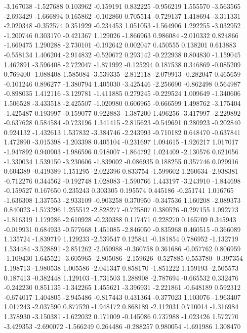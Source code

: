 -3.167038
-1.527688
0.103962
-0.159191
0.832225
-0.956219
1.555570
-3.563565
-2.693429
-1.666894
0.165862
-0.102860
0.705514
-0.729137
1.418694
-3.311331
-2.020348
-0.352574
0.351929
-0.234453
1.051053
-1.564906
1.292255
-3.032952
-1.200746
0.303170
-0.421367
1.129026
-1.866963
0.986084
-2.010332
0.824866
-1.669475
1.290288
-2.730101
-0.192642
0.002047
0.450555
0.138201
0.613883
-0.558134
1.406204
-2.914832
-0.520672
0.293142
-0.222938
0.804830
-1.159045
1.462891
-3.596408
-2.722047
-1.871992
-0.125294
0.187538
0.346869
-0.085209
0.769400
-1.088408
1.585084
-3.539335
-2.812118
-2.079913
-0.282047
0.465659
-0.101246
0.896277
-1.380794
1.405030
-3.425446
-2.256690
-0.862498
0.564987
-0.898035
1.412116
-3.129781
-1.411885
0.279245
-0.229524
1.009649
-1.340606
1.506528
-3.433518
-2.425507
-1.020980
0.606965
-0.666599
1.498762
-3.175404
-1.425487
0.193997
-0.159077
0.922883
-1.387200
1.496256
-3.417997
-2.229892
-0.637628
0.584584
-0.723196
1.341415
-2.815623
-0.549691
0.280923
-0.202840
0.924132
-1.432613
1.537832
-3.384746
-2.243993
-0.710182
0.648470
-0.637841
1.472890
-3.015398
-1.203398
0.405104
-0.231697
1.094615
-1.926217
1.017017
-1.947892
0.940903
-1.986596
0.918007
-1.864792
1.024409
-2.130576
0.621056
-1.330034
1.539150
-3.230606
-1.839002
-0.086935
0.188255
0.357746
0.029916
0.604389
-0.419389
1.151295
-2.022396
0.833754
-1.599602
1.260634
-2.938381
-0.712276
0.344562
-0.192748
1.028083
-1.590766
1.443197
-3.243910
-1.844698
-0.159527
0.167650
0.235243
0.303305
0.195574
0.445186
-0.251741
1.016765
-1.636308
1.337553
-2.933109
-0.903258
0.370950
-0.347536
1.160208
-2.089373
0.840023
-1.573296
1.255512
-2.828277
-0.725807
0.380526
-0.297155
1.092773
-1.816319
1.179286
-2.610928
-0.230388
0.117471
0.228270
0.165709
0.345943
-0.019931
0.684933
-0.577668
1.451085
-2.846050
-0.835968
0.460515
-0.366089
1.135724
-1.839719
1.129233
-2.539547
0.125841
-0.181854
0.786952
-1.132719
1.534484
-3.528891
-2.851262
-2.050988
-0.360758
0.361686
-0.057762
0.806959
-1.109430
1.645521
-3.605965
-2.805086
-2.159626
-0.527885
0.553780
-0.397354
1.198713
-1.980538
1.005586
-2.041347
0.858170
-1.851222
1.159193
-2.505573
0.187413
-0.382448
1.129103
-1.731503
1.288908
-2.787694
-0.665532
0.332476
-0.242230
0.851135
-1.342265
1.455621
-3.396931
-2.221861
-0.648189
0.592312
-0.674017
1.404805
-2.945486
-0.817443
0.431364
-0.377023
1.103076
-1.963407
1.017243
-2.037590
0.877520
-1.948172
0.868189
-2.112031
0.710014
-1.316984
1.378930
-3.150381
-1.622032
0.171009
-0.145086
0.737988
-1.023426
1.572770
-3.429353
-2.690072
-1.566249
0.264486
-0.288257
0.980054
-1.691986
1.308470

